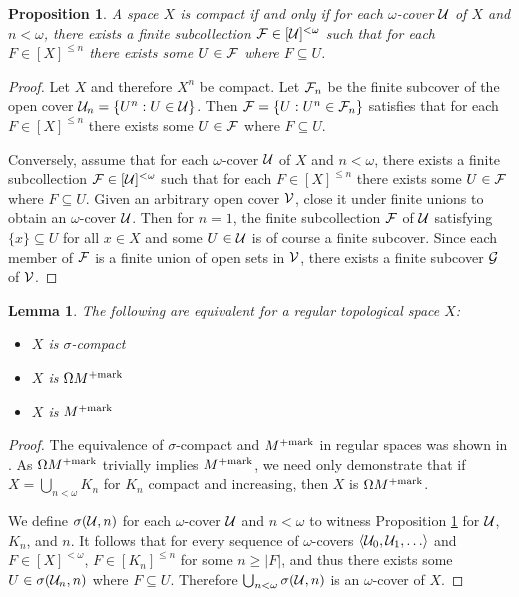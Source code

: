 \documentclass{amsart}
\theoremstyle{plain}
\newtheorem{lemma}[theorem]{Lemma}
\newtheorem{proposition}[theorem]{Proposition}
\theoremstyle{definition}
\theoremstyle{remark}
\theoremstyle{plain}
\theoremstyle{definition}
\theoremstyle{remark}
\begin{document}
\begin{proposition}\label{altCompactCharacterization}
  A space \(X\) is compact if and only if for each \(\omega\)-cover
  \(\mathcal{U}\) of \(X\) and \(n<\omega\), there exists a finite subcollection
  \(\mathcal{F}\in[\mathcal{U}]^{<\omega}\) such that for each \(F\in[X]^{\leq n}\)
  there exists some \(U\in\mathcal{F}\) where \(F\subseteq U\).
\end{proposition}

\begin{proof}
  Let \(X\) and therefore \(X^n\) be compact.
  Let \(\mathcal{F}_n\) be the finite subcover of the
  open cover \(\mathcal{U}_n=\{U^n:U\in\mathcal{U}\}\). Then
  \(\mathcal{F}=\{U:U^n\in\mathcal{F}_n\}\) satisfies that for each \(F\in[X]^{\leq n}\)
  there exists some \(U\in\mathcal{F}\) where \(F\subseteq U\).

  Conversely, assume that for each \(\omega\)-cover
  \(\mathcal{U}\) of \(X\) and \(n<\omega\), there exists a finite subcollection
  \(\mathcal{F}\in[\mathcal{U}]^{<\omega}\) such that for each \(F\in[X]^{\leq n}\)
  there exists some \(U\in\mathcal{F}\) where \(F\subseteq U\). Given an
  arbitrary open cover \(\mathcal{V}\), close it under finite unions to obtain
  an \(\omega\)-cover \(\mathcal{U}\). Then for \(n=1\),
  the finite subcollection \(\mathcal{F}\) of \(\mathcal{U}\) satisfying
  \(\{x\}\subseteq U\) for all \(x\in X\) and some \(U\in\mathcal{U}\)
  is of course a finite subcover.
  Since each member of \(\mathcal{F}\) is a finite union of open sets in
  \(\mathcal{V}\), there exists a finite subcover \(\mathcal{G}\) of \(\mathcal{V}\).
\end{proof}

\begin{lemma}
  The following are equivalent for a regular topological space \(X\):
  \begin{itemize}
    \item \(X\) is \(\sigma\)-compact
    \item \(X\) is \(\Omega M^{+\mathrm{mark}}\)
    \item \(X\) is \(M^{+\mathrm{mark}}\)
  \end{itemize}
\end{lemma}

\begin{proof}
  The equivalence of \(\sigma\)-compact and \(M^{+\mathrm{mark}}\) in regular spaces
  was shown in \cite{clontzMengerCMUC}. As \(\Omega M^{+\mathrm{mark}}\)
  trivially implies \(M^{+\mathrm{mark}}\), we need only demonstrate that
  if \(X=\bigcup_{n<\omega} K_n\) for \(K_n\) compact and increasing,
  then \(X\) is \(\Omega M^{+\mathrm{mark}}\).

  We define \(\sigma(\mathcal{U},n)\) for each \(\omega\)-cover \(\mathcal{U}\) and
  \(n<\omega\) to witness Proposition \ref{altCompactCharacterization}
  for \(\mathcal{U}\), \(K_n\), and \(n\). It follows that for every sequence of
  \(\omega\)-covers \(\<\mc U_0,\mc U_1,\dots\>\) and \(F\in[X]^{<\omega}\),
  \(F\in[K_n]^{\leq n}\) for some \(n\geq|F|\), and thus there exists some
  \(U\in\sigma(\mathcal{U}_n,n)\) where \(F\subseteq U\). Therefore
  \(\bigcup_{n<\omega}\sigma(\mathcal{U},n)\) is an \(\omega\)-cover of \(X\).
\end{proof}
\end{document}
